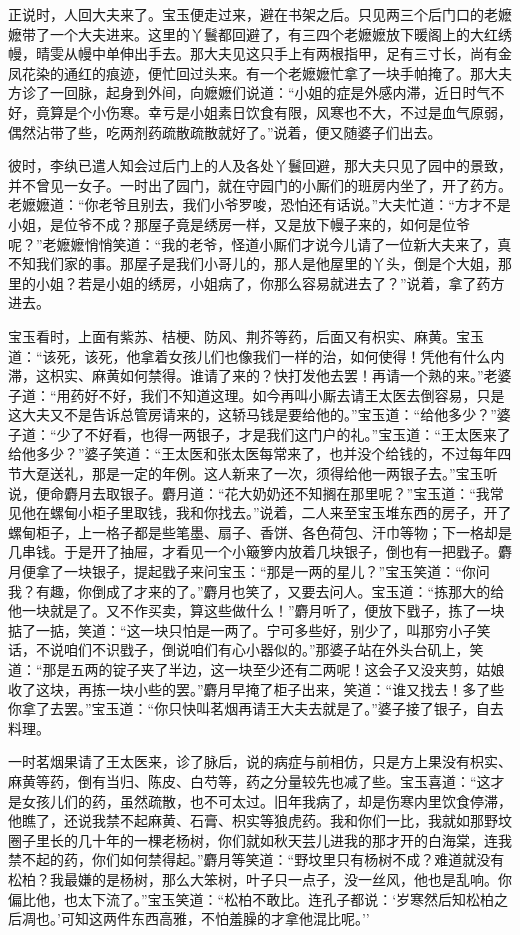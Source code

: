 正说时，人回大夫来了。宝玉便走过来，避在书架之后。只见两三个后门口的老嬷嬷带了一个大夫进来。这里的丫鬟都回避了，有三四个老嬷嬷放下暖阁上的大红绣幔，晴雯从幔中单伸出手去。那大夫见这只手上有两根指甲，足有三寸长，尚有金凤花染的通红的痕迹，便忙回过头来。有一个老嬷嬷忙拿了一块手帕掩了。那大夫方诊了一回脉，起身到外间，向嬷嬷们说道：``小姐的症是外感内滞，近日时气不好，竟算是个小伤寒。幸亏是小姐素日饮食有限，风寒也不大，不过是血气原弱，偶然沾带了些，吃两剂药疏散疏散就好了。''说着，便又随婆子们出去。

彼时，李纨已遣人知会过后门上的人及各处丫鬟回避，那大夫只见了园中的景致，并不曾见一女子。一时出了园门，就在守园门的小厮们的班房内坐了，开了药方。老嬷嬷道：``你老爷且别去，我们小爷罗唆，恐怕还有话说。''大夫忙道：``方才不是小姐，是位爷不成？那屋子竟是绣房一样，又是放下幔子来的，如何是位爷呢？''老嬷嬷悄悄笑道：``我的老爷，怪道小厮们才说今儿请了一位新大夫来了，真不知我们家的事。那屋子是我们小哥儿的，那人是他屋里的丫头，倒是个大姐，那里的小姐？若是小姐的绣房，小姐病了，你那么容易就进去了？''说着，拿了药方进去。

宝玉看时，上面有紫苏、桔梗、防风、荆芥等药，后面又有枳实、麻黄。宝玉道：``该死，该死，他拿着女孩儿们也像我们一样的治，如何使得！凭他有什么内滞，这枳实、麻黄如何禁得。谁请了来的？快打发他去罢！再请一个熟的来。''老婆子道：``用药好不好，我们不知道这理。如今再叫小厮去请王太医去倒容易，只是这大夫又不是告诉总管房请来的，这轿马钱是要给他的。''宝玉道：``给他多少？''婆子道：``少了不好看，也得一两银子，才是我们这门户的礼。''宝玉道：``王太医来了给他多少？''婆子笑道：``王太医和张太医每常来了，也并没个给钱的，不过每年四节大趸送礼，那是一定的年例。这人新来了一次，须得给他一两银子去。''宝玉听说，便命麝月去取银子。麝月道：``花大奶奶还不知搁在那里呢？''宝玉道：``我常见他在螺甸小柜子里取钱，我和你找去。''说着，二人来至宝玉堆东西的房子，开了螺甸柜子，上一格子都是些笔墨、扇子、香饼、各色荷包、汗巾等物；下一格却是几串钱。于是开了抽屉，才看见一个小簸箩内放着几块银子，倒也有一把戥子。麝月便拿了一块银子，提起戥子来问宝玉：``那是一两的星儿？''宝玉笑道：``你问我？有趣，你倒成了才来的了。''麝月也笑了，又要去问人。宝玉道：``拣那大的给他一块就是了。又不作买卖，算这些做什么！''麝月听了，便放下戥子，拣了一块掂了一掂，笑道：``这一块只怕是一两了。宁可多些好，别少了，叫那穷小子笑话，不说咱们不识戥子，倒说咱们有心小器似的。''那婆子站在外头台矶上，笑道：``那是五两的锭子夹了半边，这一块至少还有二两呢！这会子又没夹剪，姑娘收了这块，再拣一块小些的罢。''麝月早掩了柜子出来，笑道：``谁又找去！多了些你拿了去罢。''宝玉道：``你只快叫茗烟再请王大夫去就是了。''婆子接了银子，自去料理。

一时茗烟果请了王太医来，诊了脉后，说的病症与前相仿，只是方上果没有枳实、麻黄等药，倒有当归、陈皮、白芍等，药之分量较先也减了些。宝玉喜道：``这才是女孩儿们的药，虽然疏散，也不可太过。旧年我病了，却是伤寒内里饮食停滞，他瞧了，还说我禁不起麻黄、石膏、枳实等狼虎药。我和你们一比，我就如那野坟圈子里长的几十年的一棵老杨树，你们就如秋天芸儿进我的那才开的白海棠，连我禁不起的药，你们如何禁得起。''麝月等笑道：``野坟里只有杨树不成？难道就没有松柏？我最嫌的是杨树，那么大笨树，叶子只一点子，没一丝风，他也是乱响。你偏比他，也太下流了。''宝玉笑道：``松柏不敢比。连孔子都说：`岁寒然后知松柏之后凋也。'可知这两件东西高雅，不怕羞臊的才拿他混比呢。''

